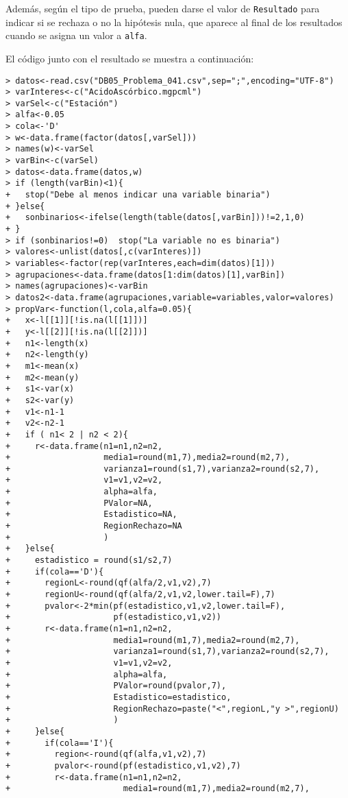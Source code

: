 \begin{solucion}
 Adem\'as, seg\'un el tipo de prueba, pueden darse el valor
 de \texttt{Resultado} para indicar si se rechaza o no
 la hip\'otesis nula, que aparece al final de los resultados
 cuando se asigna un valor a \texttt{alfa}.
 \par 
 El c\'odigo junto con el resultado se muestra a continuaci\'on:
 \begin{verbatim}
> datos<-read.csv("DB05_Problema_041.csv",sep=";",encoding="UTF-8")
> varInteres<-c("AcidoAscórbico.mgpcml")
> varSel<-c("Estación")
> alfa<-0.05
> cola<-'D'
> w<-data.frame(factor(datos[,varSel]))
> names(w)<-varSel
> varBin<-c(varSel)
> datos<-data.frame(datos,w)
> if (length(varBin)<1){
+   stop("Debe al menos indicar una variable binaria")
+ }else{
+   sonbinarios<-ifelse(length(table(datos[,varBin]))!=2,1,0)
+ }
> if (sonbinarios!=0)  stop("La variable no es binaria")
> valores<-unlist(datos[,c(varInteres)])
> variables<-factor(rep(varInteres,each=dim(datos)[1]))
> agrupaciones<-data.frame(datos[1:dim(datos)[1],varBin])
> names(agrupaciones)<-varBin
> datos2<-data.frame(agrupaciones,variable=variables,valor=valores)
> propVar<-function(l,cola,alfa=0.05){
+   x<-l[[1]][!is.na(l[[1]])]
+   y<-l[[2]][!is.na(l[[2]])]
+   n1<-length(x)
+   n2<-length(y)
+   m1<-mean(x)
+   m2<-mean(y)
+   s1<-var(x)
+   s2<-var(y)
+   v1<-n1-1
+   v2<-n2-1
+   if ( n1< 2 | n2 < 2){
+     r<-data.frame(n1=n1,n2=n2,
+                   media1=round(m1,7),media2=round(m2,7),
+                   varianza1=round(s1,7),varianza2=round(s2,7),
+                   v1=v1,v2=v2,
+                   alpha=alfa,
+                   PValor=NA,
+                   Estadistico=NA,
+                   RegionRechazo=NA
+                   )
+   }else{
+     estadistico = round(s1/s2,7)
+     if(cola=='D'){
+       regionL<-round(qf(alfa/2,v1,v2),7)
+       regionU<-round(qf(alfa/2,v1,v2,lower.tail=F),7)
+       pvalor<-2*min(pf(estadistico,v1,v2,lower.tail=F),
+                     pf(estadistico,v1,v2))
+       r<-data.frame(n1=n1,n2=n2,
+                     media1=round(m1,7),media2=round(m2,7),
+                     varianza1=round(s1,7),varianza2=round(s2,7),
+                     v1=v1,v2=v2,
+                     alpha=alfa,
+                     PValor=round(pvalor,7),
+                     Estadistico=estadistico,
+                     RegionRechazo=paste("<",regionL,"y >",regionU)
+                     )
+     }else{
+       if(cola=='I'){
+         region<-round(qf(alfa,v1,v2),7)
+         pvalor<-round(pf(estadistico,v1,v2),7)
+         r<-data.frame(n1=n1,n2=n2,
+                       media1=round(m1,7),media2=round(m2,7),

\end{verbatim}
\end{solucion}
